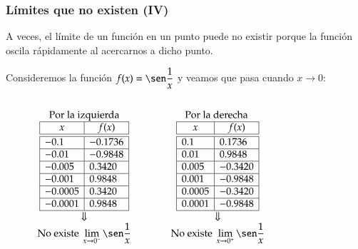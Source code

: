 \begin{frame}
	\frametitle{Límites que no existen (IV)}
	A veces, el límite de un función en un punto puede no existir porque la función oscila rápidamente al acercarnos a dicho punto.
	
	 Consideremos la función $f(x)=\sen \dfrac{1}{x}$ y veamos que pasa cuando $x\rightarrow 0$:
	\begin{columns}
		\begin{column}{0.6\textwidth}
			\footnotesize
			\[
				\begin{array}{ccc}
					\textrm{Por la izquierda} & \qquad & \textrm{Por la derecha } \\
					\begin{array}{|l|l|}
					\hline
					\multicolumn{1}{|c|}{x}      & \multicolumn{1}{c|}{f(x)}   \\
					\hline\hline
					-0.1   & -0.1736       \\
					\hline
					-0.01   & -0.9848     \\
					\hline
					-0.005 & 0.3420 \\
					\hline
					-0.001  & 0.9848  \\
					\hline
					-0.0005  & 0.3420\\
					\hline
					-0.0001 & 0.9848 \\
					\hline
				\end{array}
				& &
				\begin{array}{|l|l|}
					\hline
					\multicolumn{1}{|c|}{x} & \multicolumn{1}{c|}{f(x)} \\
					\hline\hline
					0.1                     & 0.1736                    \\
					\hline
					0.01                    & 0.9848                    \\
					\hline
					0.005                   & -0.3420                   \\
					\hline
					0.001                   & -0.9848                   \\
					\hline
					0.0005                  & -0.3420                   \\
					\hline
					0.0001                  & -0.9848                   \\
					\hline
				\end{array}\\
				\Downarrow & & \Downarrow\\
				\displaystyle \textrm{No existe }\lim_{x\rightarrow 0^-}\sen \frac{1}{x}
				& &
				\displaystyle \textrm{No existe }\lim_{x\rightarrow 0^+}\sen \frac{1}{x}
				\end{array}
			\]
		\end{column}
		\begin{column}{0.4\textwidth}
			\begin{center}
				\scalebox{1}{}
			\end{center}
		\end{column}
	\end{columns}
\end{frame}


